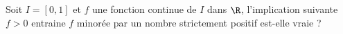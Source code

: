 Soit $I=[0,1]$ et $f$ une fonction continue de $I$ dans $\R$, l'implication suivante \newline
$f>0$ entraine $f$ minor\'ee par un nombre strictement positif \newline est-elle vraie ? \bigskip